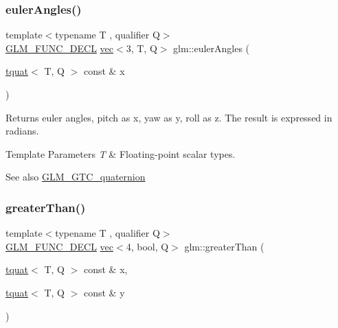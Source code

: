 \subsubsection{\texorpdfstring{euler\+Angles()}{eulerAngles()}}
{\footnotesize\ttfamily template$<$typename T , qualifier Q$>$ \\
\mbox{\hyperlink{setup_8hpp_ab2d052de21a70539923e9bcbf6e83a51}{G\+L\+M\+\_\+\+F\+U\+N\+C\+\_\+\+D\+E\+CL}} \mbox{\hyperlink{structglm_1_1vec}{vec}}$<$3, T, Q$>$ glm\+::euler\+Angles (\begin{DoxyParamCaption}\item[{\mbox{\hyperlink{structglm_1_1tquat}{tquat}}$<$ T, Q $>$ const \&}]{x }\end{DoxyParamCaption})}

Returns euler angles, pitch as x, yaw as y, roll as z. The result is expressed in radians.


\begin{DoxyTemplParams}{Template Parameters}
{\em T} & Floating-\/point scalar types.\\
\hline
\end{DoxyTemplParams}
\begin{DoxySeeAlso}{See also}
\mbox{\hyperlink{group__gtc__quaternion}{G\+L\+M\+\_\+\+G\+T\+C\+\_\+quaternion}} 
\end{DoxySeeAlso}
\mbox{\label{group__gtc__quaternion_ga3f2720e2d77ec39186415f85ecd9cad0}} 
\subsubsection{\texorpdfstring{greater\+Than()}{greaterThan()}}
{\footnotesize\ttfamily template$<$typename T , qualifier Q$>$ \\
\mbox{\hyperlink{setup_8hpp_ab2d052de21a70539923e9bcbf6e83a51}{G\+L\+M\+\_\+\+F\+U\+N\+C\+\_\+\+D\+E\+CL}} \mbox{\hyperlink{structglm_1_1vec}{vec}}$<$4, bool, Q$>$ glm\+::greater\+Than (\begin{DoxyParamCaption}\item[{\mbox{\hyperlink{structglm_1_1tquat}{tquat}}$<$ T, Q $>$ const \&}]{x,  }\item[{\mbox{\hyperlink{structglm_1_1tquat}{tquat}}$<$ T, Q $>$ const \&}]{y }\end{DoxyParamCaption})}

